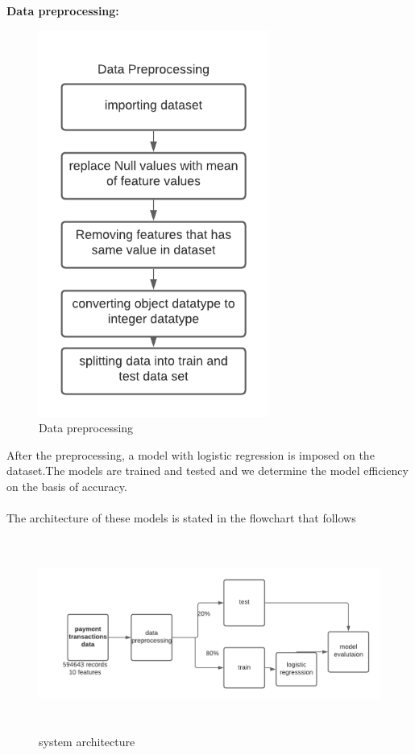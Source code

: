 \documentclass[12pt]{article}
\begin{document}
        \textbf{Data preprocessing:}
           \begin{figure}[htp]
            \centering
                \includegraphics[height=5in]{preprocessing.png}
            \caption{Data preprocessing}
            \label{fig:gal}
        \end{figure}
        
        
         
        
        After the preprocessing, a model with logistic regression is imposed on the dataset.The models are trained and tested and we
        determine the model efficiency on the basis of accuracy.\\
        \\
        The architecture of these models is stated in the flowchart that follows
 
    \begin{figure}[htp]
    \centering
\includegraphics[height=2.5in]{diagram png.png}
\caption{system architecture}
    \label{fig:gal}
\end{figure}
   
\end{document}

